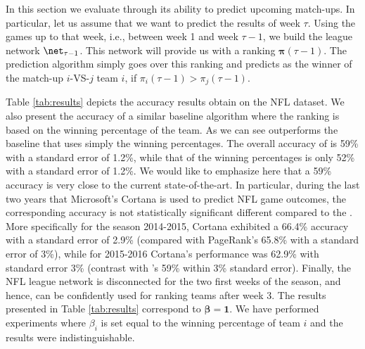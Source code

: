 In this section we evaluate {\method} through its ability to predict upcoming match-ups.  
In particular, let us assume that we want to predict the results of week $\tau$.  
Using the games up to that week, i.e., between week 1 and week $\tau-1$, we build the league network $\net_{\tau-1}$.  
This network will provide us with a ranking $\bm{\pi}(\tau-1)$. 
The prediction algorithm simply goes over this ranking and predicts as the winner of the match-up $i$-VS-$j$ team $i$, if $\pi_i(\tau-1) > \pi_j(\tau-1)$.  

Table \ref{tab:results} depicts the accuracy results obtain on the NFL dataset.  
We also present the accuracy of a similar baseline algorithm where the ranking is based on the winning percentage of the team.  
As we can see {\method} outperforms the baseline that uses simply the winning percentages.  
The overall accuracy of {\method} is 59\% with a standard error of 1.2\%, while that of the winning percentages is only 52\% with a standard error of 1.2\%.  
We would like to emphasize here that a 59\% accuracy is very close to the current state-of-the-art.  
In particular, during the last two years that Microsoft's Cortana \cite{cortana} is used to predict NFL game outcomes, the corresponding accuracy is not statistically significant different compared to the {\method}.  
More specifically for the season 2014-2015, Cortana exhibited a 66.4\% accuracy with a standard error of 2.9\% (compared with PageRank's 65.8\% with a standard error of 3\%), while for 2015-2016 Cortana's performance was 62.9\% with standard error 3\% (contrast with {\method}'s 59\% within 3\% standard error).  
Finally, the NFL league network is disconnected for the two first weeks of the season, and hence, {\method} can be confidently used for ranking teams after week 3.  
The results presented in Table \ref{tab:results} correspond to $\bm{\beta} = \bm{1}$.  
We have performed experiments where $\beta_i$ is set equal to the winning percentage of team $i$ and the results were indistinguishable.  

